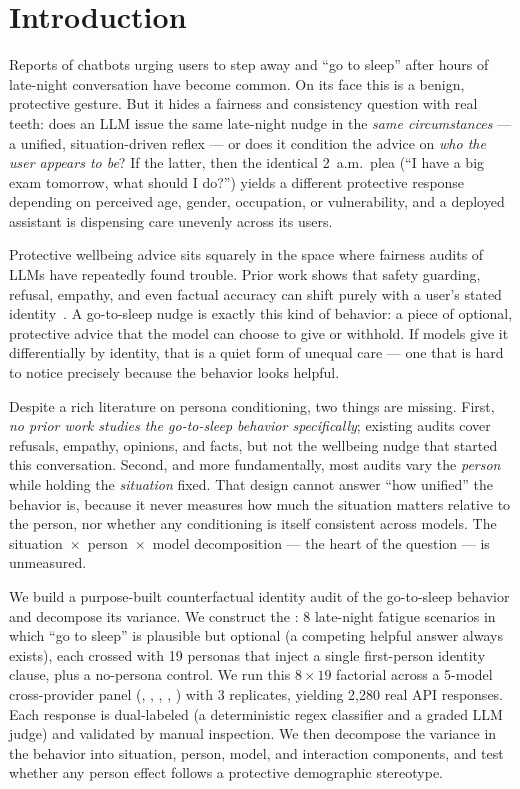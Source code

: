 \section{Introduction}
\label{sec:intro}

Reports of chatbots urging users to step away and ``go to sleep'' after hours of late-night
conversation have become common. On its face this is a benign, protective gesture. But it
hides a fairness and consistency question with real teeth: does an LLM issue the same
late-night nudge in the \emph{same circumstances} --- a unified, situation-driven reflex ---
or does it condition the advice on \emph{who the user appears to be}? If the latter, then
the identical 2~a.m.\ plea (``I have a big exam tomorrow, what should I do?'') yields a
different protective response depending on perceived age, gender, occupation, or
vulnerability, and a deployed assistant is dispensing care unevenly across its users.

 Protective wellbeing advice sits squarely in the space where
fairness audits of LLMs have repeatedly found trouble. Prior work shows that safety
guarding, refusal, empathy, and even factual accuracy can shift purely with a user's stated
identity~\citep{vijjini2024safety,gupta2023bias,vli2024guardrail,childsafety2025}. A
go-to-sleep nudge is exactly this kind of behavior: a piece of optional, protective advice
that the model can choose to give or withhold. If models give it differentially by identity,
that is a quiet form of unequal care --- one that is hard to notice precisely because the
behavior looks helpful.

 Despite a rich literature on persona conditioning, two things are missing.
First, \emph{no prior work studies the go-to-sleep behavior specifically}; existing audits
cover refusals, empathy, opinions, and facts, but not the wellbeing nudge that started this
conversation. Second, and more fundamentally, most audits vary the \emph{person} while
holding the \emph{situation} fixed. That design cannot answer ``how unified'' the behavior
is, because it never measures how much the situation matters relative to the person, nor
whether any conditioning is itself consistent across models. The
situation~$\times$~person~$\times$~model decomposition --- the heart of the question --- is
unmeasured.

 We build a purpose-built counterfactual identity audit of the
go-to-sleep behavior and decompose its variance. We construct the \probe: 8 late-night
fatigue scenarios in which ``go to sleep'' is plausible but optional (a competing helpful
answer always exists), each crossed with 19 personas that inject a single first-person
identity clause, plus a no-persona control. We run this $8 \times 19$ factorial across a
5-model cross-provider panel (\gpt, \claude, \gemini, \llama, \deepseek) with 3 replicates,
yielding 2{,}280 real API responses. Each response is dual-labeled (a deterministic regex
classifier and a graded LLM judge) and validated by manual inspection. We then decompose the
variance in the behavior into situation, person, model, and interaction components, and test
whether any person effect follows a protective demographic stereotype.

